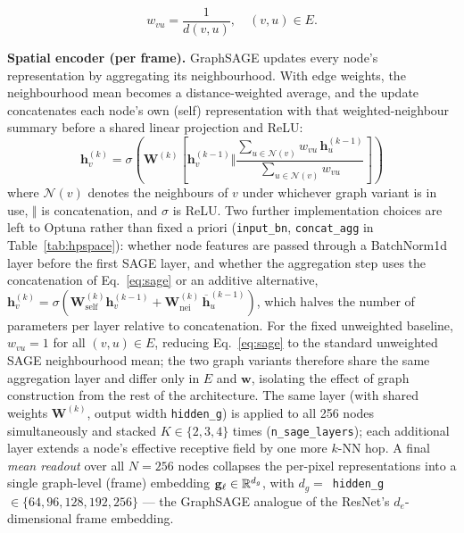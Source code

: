 \begin{equation}
  w_{vu} = \frac{1}{d(v,u)}, \quad (v, u) \in E.
  \label{eq:edge_weight}
\end{equation}

\textbf{Spatial encoder (per frame).} GraphSAGE \cite{hamilton2017} updates
every node's representation by aggregating its neighbourhood. With edge
weights, the neighbourhood mean becomes a distance-weighted average, and the
update concatenates each node's own (self) representation with that
weighted-neighbour summary before a shared linear projection and ReLU:
\begin{equation}
  \mathbf{h}_v^{(k)} = \sigma\!\left(
    \mathbf{W}^{(k)} \left[ \mathbf{h}_v^{(k-1)} \Vert
    \frac{\sum_{u \in \mathcal{N}(v)} w_{vu}\,\mathbf{h}_u^{(k-1)}}
         {\sum_{u \in \mathcal{N}(v)} w_{vu}} \right]
  \right)
  \label{eq:sage}
\end{equation}
where $\mathcal{N}(v)$ denotes the neighbours of $v$ under whichever graph
variant is in use, $\Vert$ is concatenation, and $\sigma$ is ReLU. Two further
implementation choices are left to Optuna rather than fixed a priori
(\texttt{input\_bn}, \texttt{concat\_agg} in Table~\ref{tab:hpspace}): whether
node features are passed through a BatchNorm1d layer before the first SAGE
layer, and whether the aggregation step uses the concatenation of
Eq.~\ref{eq:sage} or an additive alternative,
$\mathbf{h}_v^{(k)} = \sigma(\mathbf{W}^{(k)}_\text{self}\mathbf{h}_v^{(k-1)} +
\mathbf{W}^{(k)}_\text{nei}\,\overline{\mathbf{h}}_u^{(k-1)})$, which halves
the number of parameters per layer relative to concatenation. For the
fixed unweighted baseline, $w_{vu} = 1$ for all $(v,u) \in E$, reducing
Eq.~\ref{eq:sage} to the standard unweighted SAGE neighbourhood mean; the two
graph variants therefore share the same aggregation layer and differ only in
$E$ and $\mathbf{w}$, isolating the effect of graph construction from the
rest of the architecture. The same layer (with shared weights
$\mathbf{W}^{(k)}$, output width \texttt{hidden\_g}) is applied to all 256
nodes simultaneously and stacked $K \in \{2,3,4\}$ times
(\texttt{n\_sage\_layers}); each additional layer extends a node's effective
receptive field by one more $k$-NN hop. A final \emph{mean readout} over all
$N = 256$ nodes collapses the per-pixel representations into a single
graph-level (frame) embedding $\mathbf{g}_\ell \in \mathbb{R}^{d_g}$, with
$d_g = $~\texttt{hidden\_g}~$\in \{64,96,128,192,256\}$ --- the GraphSAGE
analogue of the ResNet's $d_e$-dimensional frame embedding.

